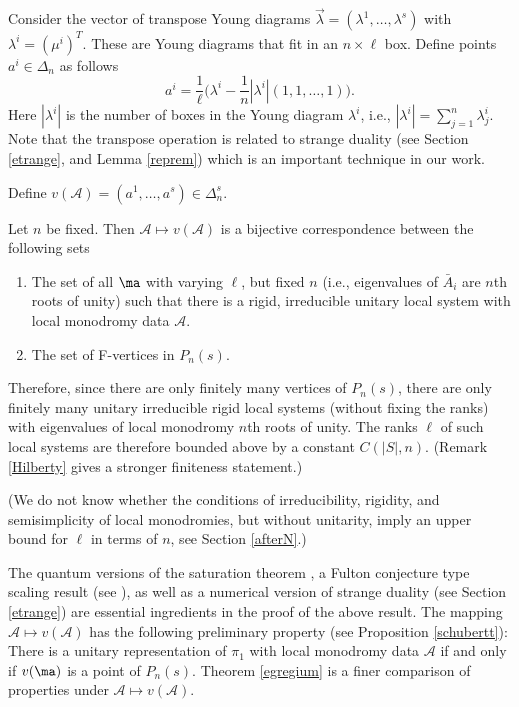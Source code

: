 Consider the vector of transpose Young diagrams $\vec{\lambda}=(\lambda^1,\dots,\lambda^s)$ with $\lambda^i=(\mu^i)^T$. These are Young diagrams that fit in an $n\times\ell$ box.  Define points
${a}^i\in\Delta_{n}$ as follows
$$a^i=\frac{1}{\ell}\bigl(\lambda^i -\frac{1}{n}|\lambda^i|(1,1,\dots,1)\bigr).$$
Here $|\lambda^i|$ is the number of boxes in the Young diagram $\lambda^i$, i.e., $|\lambda^i|=\sum_{j=1}^n \lambda^i_j$. Note that the transpose operation is related to strange duality (see Section \ref{etrange}, and Lemma \ref{reprem}) which is an important technique in our work.
\begin{defi}
\notready\label{finiteness}
Define $v(\mathcal{A})=(a^1,\dots,a^s)\in \Delta_{n}^s$.
\end{defi}
\begin{theorem}
\notready\label{egregium}
Let $n$ be fixed. Then $\mathcal{A}\mapsto v(\mathcal{A})$  is a bijective correspondence between the following sets
\begin{enumerate}
\item The set of all $\ma$ with varying $\ell$, but fixed $n$ (i.e., eigenvalues of $\bar{A}_i$ are $n$th roots of unity) such that there is a rigid, irreducible unitary local system with local monodromy data $\mathcal{A}$.
\item The set  of F-vertices in $P_n(s)$.
\end{enumerate}
Therefore, since there are only finitely many vertices of $P_n(s)$, there are only finitely many unitary irreducible rigid local systems (without fixing the ranks) with eigenvalues of local monodromy $n$th roots of unity. The ranks $\ell$ of such local systems are therefore bounded above by a constant $C(|S|,n)$.
(Remark \ref{Hilberty} gives a stronger finiteness statement.)
\end{theorem}
(We do not know whether the conditions of irreducibility, rigidity, and semisimplicity of local monodromies, but without unitarity, imply an upper bound for $\ell$ in terms of $n$, see Section \ref{afterN}.)

The quantum versions of the saturation theorem \cite{BHorn}, a Fulton conjecture  type scaling result (see \cite[Remark 8.5]{BKq}), as well as  a numerical version of strange duality (see Section \ref{etrange}) are essential ingredients in the proof of the above result.  The mapping $\mathcal{A}\mapsto v(\mathcal{A})$ has the following preliminary  property (see Proposition \ref{schubertt}): There is a unitary representation of $\pi_1$ with  local monodromy data $\mathcal{A}$ if and only if
 $v(\ma)$ is a point of $P_n(s)$. Theorem \ref{egregium} is a finer comparison of properties under $\mathcal{A}\mapsto v(\mathcal{A})$.


